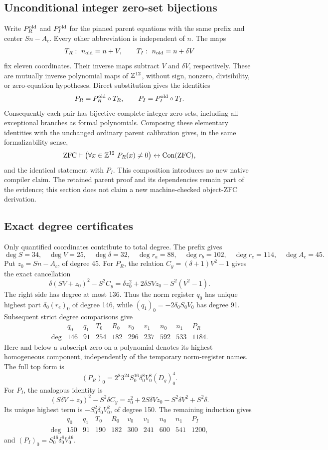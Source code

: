 \subsection{Unconditional integer zero-set bijections}

Write $P_R^{\rm old}$ and $P_I^{\rm old}$ for the pinned parent equations
with the same prefix and center $Sn-A_c$.  Every other abbreviation is
independent of $n$.  The maps
\[
 T_R:\ n_{\rm old}=n+V,\qquad
 T_I:\ n_{\rm old}=n+\delta V
\]
fix eleven coordinates.  Their inverse maps subtract $V$ and $\delta V$,
respectively.  These are mutually inverse polynomial maps of $\mathbb Z^{12}$,
without sign, nonzero, divisibility, or zero-equation hypotheses.
Direct substitution gives the identities
\[
 P_R=P_R^{\rm old}\circ T_R,\qquad
 P_I=P_I^{\rm old}\circ T_I.
\]
Consequently each pair has bijective complete integer zero sets, including
all exceptional branches as formal polynomials.  Composing these elementary
identities with the unchanged ordinary parent calibration gives, in the
same formalizability sense,
\[
 \mathrm{ZFC}\vdash
 \bigl(\forall x\in\mathbb Z^{12}\ P_R(x)\ne0\bigr)
 \leftrightarrow\operatorname{Con}(\mathrm{ZFC}),
\]
and the identical statement with $P_I$.  This composition introduces no
new native compiler claim.  The retained parent proof and its dependencies
remain part of the evidence; this section does not claim a new
machine-checked object-ZFC derivation.

\subsection{Exact degree certificates}

Only quantified coordinates contribute to total degree.  The prefix gives
\[
 \deg S=34,\quad\deg V=25,\quad\deg\delta=32,\quad
 \deg r_a=88,\quad\deg r_b=102,\quad\deg r_e=114,\quad
 \deg A_c=45.
\]
Put $z_0=Sn-A_c$, of degree 45.  For $P_R$, the relation
$C_y=(\delta+1)V^2-1$ gives the exact cancellation
\[
 \delta(SV+z_0)^2-S^2C_y
   =\delta z_0^2+2\delta SVz_0-S^2(V^2-1).
\]
The right side has degree at most 136.  Thus the norm register $q_0$ has
unique highest part $\delta_0(r_e)_0$ of degree 146, while
$(q_1)_0=-2\delta_0S_0V_0$ has degree 91.  Subsequent strict degree
comparisons give
\[
\begin{array}{c|rrrrrrrrr}
 &q_0&q_1&T_0&R_0&v_0&v_1&n_0&n_1&P_R\\\hline
 \deg&146&91&254&182&296&237&592&533&1184.
\end{array}
\]
Here and below a subscript zero on a polynomial denotes its highest
homogeneous component, independently of the temporary norm-register
names.  The full top form is
\[
 (P_R)_0=2^8 3^{24}S_0^{16}\delta_0^8V_0^8(D_g)_0^4.
\]
For $P_I$, the analogous identity is
\[
 (S\delta V+z_0)^2-S^2\delta C_y
 =z_0^2+2S\delta Vz_0-S^2\delta V^2+S^2\delta.
\]
Its unique highest term is $-S_0^2\delta_0V_0^2$, of degree 150.  The
remaining induction gives
\[
\begin{array}{c|rrrrrrrrr}
 &q_0&q_1&T_0&R_0&v_0&v_1&n_0&n_1&P_I\\\hline
 \deg&150&91&190&182&300&241&600&541&1200,
\end{array}
\]
and $(P_I)_0=S_0^{16}\delta_0^8V_0^{16}$.

